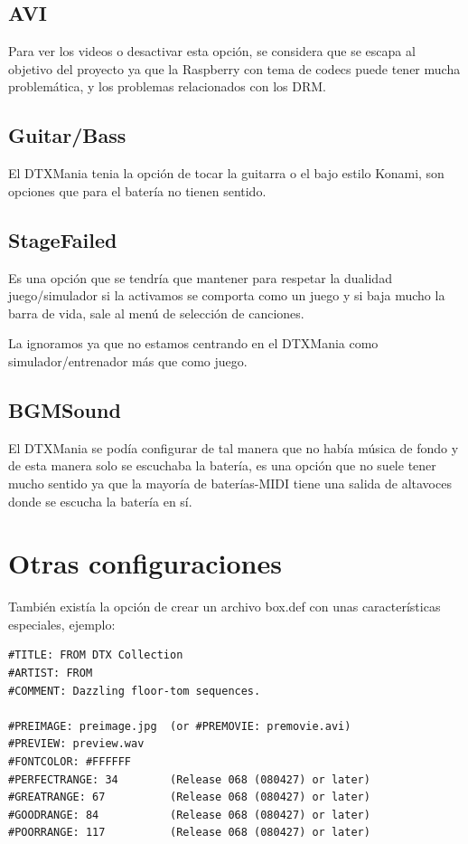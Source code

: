\documentclass[a4paper,11pt,oneside]{book}
\begin{document}
\subsection{AVI}
Para ver los videos o desactivar esta opción, se considera que se escapa al objetivo del proyecto ya que la Raspberry con tema de codecs puede tener mucha problemática, y los problemas relacionados con los DRM.

\subsection{Guitar/Bass}
El DTXMania tenia la opción de tocar la guitarra o el bajo estilo Konami, son opciones que para el batería no tienen sentido.

\subsection{StageFailed}
Es una opción que se tendría que mantener para respetar la dualidad juego/simulador si la activamos se comporta como un juego y si baja mucho la barra de vida, sale al menú de selección de canciones.

La ignoramos ya que no estamos centrando en el DTXMania como simulador/entrenador más que como juego.

\subsection{BGMSound}
El DTXMania se podía configurar de tal manera que no había música de fondo y de esta manera solo se escuchaba la batería, es una opción que no suele tener mucho sentido ya que la mayoría de baterías-MIDI tiene una salida de altavoces donde se escucha la batería en sí.



\section{Otras configuraciones}
También existía la opción de crear un archivo box.def con unas características especiales, ejemplo:

\begin{Verbatim}[frame=single]
#TITLE: FROM DTX Collection
#ARTIST: FROM
#COMMENT: Dazzling floor-tom sequences.

#PREIMAGE: preimage.jpg  (or #PREMOVIE: premovie.avi)
#PREVIEW: preview.wav
#FONTCOLOR: #FFFFFF
#PERFECTRANGE: 34        (Release 068 (080427) or later)
#GREATRANGE: 67          (Release 068 (080427) or later)
#GOODRANGE: 84           (Release 068 (080427) or later)
#POORRANGE: 117          (Release 068 (080427) or later)
\end{Verbatim}
\end{document}
